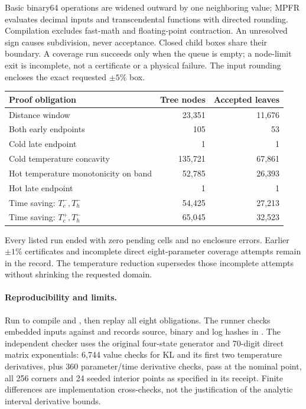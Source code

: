 Basic binary64 operations are widened outward by one neighboring value;
MPFR evaluates decimal inputs and transcendental functions with directed
rounding. Compilation excludes fast-math and floating-point contraction.
An unresolved sign causes subdivision, never acceptance. Closed child
boxes share their boundary. A coverage run succeeds only when the queue
is empty; a node-limit exit is incomplete, not a certificate or a physical
failure. The input rounding encloses the exact requested $\pm5\%$ box.

\begin{center}
\begin{tabular}{lrr}
\toprule
Proof obligation & Tree nodes & Accepted leaves\\
\midrule
Distance window & 23,351 & 11,676\\
Both early endpoints & 105 & 53\\
Cold late endpoint & 1 & 1\\
Cold temperature concavity & 135,721 & 67,861\\
Hot temperature monotonicity on band & 52,785 & 26,393\\
Hot late endpoint & 1 & 1\\
Time saving: $T_c^-,T_h^-$ & 54,425 & 27,213\\
Time saving: $T_c^+,T_h^-$ & 65,045 & 32,523\\
\bottomrule
\end{tabular}
\end{center}
Every listed run ended with zero pending cells and no enclosure errors.
Earlier $\pm1\%$ certificates and incomplete direct eight-parameter
coverage attempts remain in the record. The temperature reduction
supersedes those incomplete attempts without shrinking the requested domain.

\paragraph{Reproducibility and limits.}
Run  to compile
 and
, then replay
all eight obligations. The runner checks embedded inputs against
 and records source, binary and
log hashes in .
The independent checker 
uses the original four-state generator and 70-digit direct matrix
exponentials: 6,744 value checks for KL and its first two temperature
derivatives, plus 360 parameter/time derivative checks, pass at the
nominal point, all 256 corners and 24 seeded interior points as specified
in its receipt. Finite differences are implementation cross-checks, not
the justification of the analytic interval derivative bounds.

